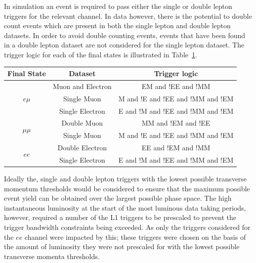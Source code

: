 In simulation an event is required to pass either the single or double lepton triggers for the relevant channel.
In data however, there is the potential to double count events which are present in both the single lepton and double lepton datasets.
In order to avoid double counting events, events that have been found in a double lepton dataset are not considered for the single lepton dataset.
The trigger logic for each of the final states is illustrated in Table~\ref{tab:triggerCombo}.

\begin{table}[htbp]
\label{tab:triggerCombo}
  \centering
   \begin{tabular}{ccc}
   \hline
   \textbf{Final State} & \textbf{Dataset} & \textbf{Trigger logic}  \\
   \hline
   \multirow{3}{*}{$e\mu$} & Muon and Electron & EM and !EE and !MM \\
   & Single Muon & M and !E and !EE and !MM and !EM \\
   & Single Electron & E and !M and !EE and !MM and !EM \\
   \hline
   \multirow{2}{*}{$\mu\mu$} & Double Muon & MM and !EM and !EE\\
   & Single Muon & M and !E and !EE and !MM and !EM \\
   \hline  
   \multirow{2}{*}{$ee$} & Double Electron & EE and !EM and !MM \\
   & Single Electron & E and !M and !EE and !MM and !EM \\
   \hline
 \end{tabular}%
\end{table}

Ideally the, single and double lepton triggers with the lowest possible transverse momentum thresholds would be considered to ensure that the maximum possible event yield can be obtained over the largest possible phase space.
The high instantaneous luminosity at the start of the most luminous data taking periods, however, required a number of the L1 triggers to be prescaled to prevent the trigger bandwidth constraints being exceeded.
As only the triggers considered for the $ee$ channel were impacted by this; these triggers were chosen on the basis of the amount of luminosity they were not prescaled for with the lowest possible transverse momenta thresholds.

